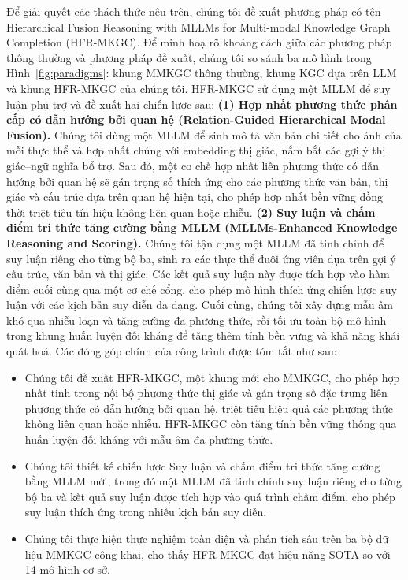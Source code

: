 \documentclass[10pt,twocolumn,a4paper]{article}
\begin{document}
Để giải quyết các thách thức nêu trên, chúng tôi đề xuất phương pháp có tên Hierarchical Fusion Reasoning with MLLMs for Multi-modal Knowledge Graph Completion (HFR-MKGC). Để minh hoạ rõ khoảng cách giữa các phương pháp thông thường và phương pháp đề xuất, chúng tôi so sánh ba mô hình trong Hình~\ref{fig:paradigms}: khung MMKGC thông thường, khung KGC dựa trên LLM và khung HFR-MKGC của chúng tôi. HFR-MKGC sử dụng một MLLM để suy luận phụ trợ và đề xuất hai chiến lược sau: \textbf{(1) Hợp nhất phương thức phân cấp có dẫn hướng bởi quan hệ (Relation-Guided Hierarchical Modal Fusion).} Chúng tôi dùng một MLLM để sinh mô tả văn bản chi tiết cho ảnh của mỗi thực thể và hợp nhất chúng với embedding thị giác, nắm bắt các gợi ý thị giác--ngữ nghĩa bổ trợ. Sau đó, một cơ chế hợp nhất liên phương thức có dẫn hướng bởi quan hệ sẽ gán trọng số thích ứng cho các phương thức văn bản, thị giác và cấu trúc dựa trên quan hệ hiện tại, cho phép hợp nhất bền vững đồng thời triệt tiêu tín hiệu không liên quan hoặc nhiễu. \textbf{(2) Suy luận và chấm điểm tri thức tăng cường bằng MLLM (MLLMs-Enhanced Knowledge Reasoning and Scoring).} Chúng tôi tận dụng một MLLM đã tinh chỉnh để suy luận riêng cho từng bộ ba, sinh ra các thực thể đuôi ứng viên dựa trên gợi ý cấu trúc, văn bản và thị giác. Các kết quả suy luận này được tích hợp vào hàm điểm cuối cùng qua một cơ chế cổng, cho phép mô hình thích ứng chiến lược suy luận với các kịch bản suy diễn đa dạng. Cuối cùng, chúng tôi xây dựng mẫu âm khó qua nhiễu loạn và tăng cường đa phương thức, rồi tối ưu toàn bộ mô hình trong khung huấn luyện đối kháng để tăng thêm tính bền vững và khả năng khái quát hoá. Các đóng góp chính của công trình được tóm tắt như sau:
\begin{itemize}
\item Chúng tôi đề xuất HFR-MKGC, một khung mới cho MMKGC, cho phép hợp nhất tinh trong nội bộ phương thức thị giác và gán trọng số đặc trưng liên phương thức có dẫn hướng bởi quan hệ, triệt tiêu hiệu quả các phương thức không liên quan hoặc nhiễu. HFR-MKGC còn tăng tính bền vững thông qua huấn luyện đối kháng với mẫu âm đa phương thức.
\item Chúng tôi thiết kế chiến lược Suy luận và chấm điểm tri thức tăng cường bằng MLLM mới, trong đó một MLLM đã tinh chỉnh suy luận riêng cho từng bộ ba và kết quả suy luận được tích hợp vào quá trình chấm điểm, cho phép suy luận thích ứng trong nhiều kịch bản suy diễn.
\item Chúng tôi thực hiện thực nghiệm toàn diện và phân tích sâu trên ba bộ dữ liệu MMKGC công khai, cho thấy HFR-MKGC đạt hiệu năng SOTA so với 14 mô hình cơ sở.
\end{itemize}
\end{document}
